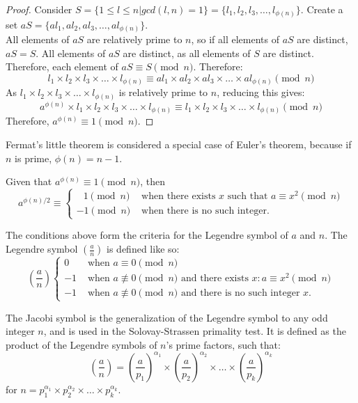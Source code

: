 \documentclass{article}
\begin{document}
\begin{proof}
    Consider $S = \{1 \leq l \leq n | gcd(l, n) = 1\} = \{l_1, l_2, l_3, \ldots{}, l_{\phi(n)}\}$.
    Create a set $aS = \{al_1, al_2, al_3, \ldots{}, al_{\phi(n)}\}$. \\
    All elements of $aS$ are relatively prime to $n$, so if all elements of $aS$ are distinct, $aS = S$. All elements of $aS$ are distinct, as all elements of $S$ are distinct. Therefore, each element of $aS \equiv S \pmod{n}$.
    Therefore:
    \[
        l_1 \times l_2 \times l_3 \times \ldots{} \times l_{\phi(n)} \equiv al_1 \times al_2 \times al_3 \times \ldots{} \times al_{\phi(n)} \pmod{n}
    \]
    As $l_1 \times l_2 \times l_3 \times \ldots{} \times l_{\phi(n)}$ is relatively prime to $n$, reducing this gives:
    \[
        a^{\phi(n)} \times l_1 \times l_2 \times l_3 \times \ldots{} \times l_{\phi(n)} \equiv l_1 \times l_2 \times l_3 \times \ldots{} \times l_{\phi(n)} \pmod{n}
    \]
    Therefore, $a^{\phi(n)} \equiv 1 \pmod{n}$.
\end{proof}

Fermat's little theorem is considered a special case of Euler's theorem, because if $n$ is prime, $\phi(n) = n - 1$.

Given that $a^{\phi(n)} \equiv 1 \pmod{n}$, then 
\[
    a^{\phi(n) / 2} \equiv \begin{cases}
\;\;\,1\pmod{n}& \text{ when there exists }x \text{ such that }a\equiv x^2 \pmod{n}\\
     -1\pmod{n}& \text{ when there is no such integer.}
\end{cases}
\]

The conditions above form the criteria for the Legendre symbol of $a$ and $n$. The Legendre symbol $(\frac{a}{n})$ is defined like so:
\[
    (\frac{a}{n}) \begin{cases}
        0 & \text{ when $a \equiv 0 \pmod{n}$} \\
        -1& \text{ when $a \not\equiv 0 \pmod{n}$ and there exists $x: a \equiv x^2 \pmod{n}$} \\
     -1& \text{ when $a \not\equiv 0 \pmod{n}$ and there is no such integer $x$.}
\end{cases}
\]

The Jacobi symbol is the generalization of the Legendre symbol to any odd integer $n$, and is used in the Solovay-Strassen primality test. It is defined as the product of the Legendre symbols of $n$'s prime factors, such that:
\[
    (\frac{a}{n}) = (\frac{a}{p_1})^{\alpha_{1}} \times (\frac{a}{p_2})^{\alpha_{2}} \times \ldots{} \times (\frac{a}{p_k})^{\alpha_{k}}
\]
for $n = p_1^{\alpha_{1}} \times p_2^{\alpha_{2}} \times \ldots{} \times p_k^{\alpha_{k}}$.
\end{document}
